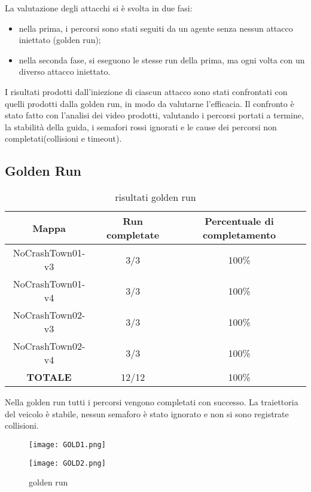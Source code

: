 La valutazione degli attacchi si è svolta in due fasi:\begin{itemize}
    \item nella prima, i percorsi sono stati seguiti da un agente senza nessun attacco iniettato (golden run);
    \item nella seconda fase, si eseguono le stesse run della prima, ma ogni volta con un diverso attacco iniettato.
\end{itemize}
I risultati prodotti dall'iniezione di ciascun attacco sono stati confrontati con quelli prodotti dalla golden run, in modo da valutarne l'efficacia.
Il confronto è stato fatto con l'analisi dei video prodotti, valutando i percorsi portati a termine,  la stabilità della guida, i semafori rossi ignorati e le cause dei percorsi
non completati(collisioni e timeout).
\subsection{Golden Run}
\begin{table}[h]
    \begin{tabular}{|c|c|c|}
        \hline
        Mappa                   & Run completate & Percentuale di completamento\\
        \hline
        NoCrashTown01-v3        & 3/3            & 100\% \\
        NoCrashTown01-v4        & 3/3            & 100\% \\
        NoCrashTown02-v3        & 3/3            & 100\% \\
        NoCrashTown02-v4        & 3/3            & 100\%  \\
        \hline
        \textbf{TOTALE}                  & 12/12          & 100\% \\
        \hline
    \end{tabular}
    \caption{risultati golden run}
Nella golden run tutti i percorsi vengono completati con successo. La traiettoria del veicolo è stabile, nessun semaforo è stato ignorato e non si sono registrate collisioni.
\end{table}
\begin{figure}[h!]
    \centering
    \parbox{6cm}{
    \texttt{[image: GOLD1.png]}
    \label{fig:gold1}}
    \qquad
    \begin{minipage}{6cm}
    \texttt{[image: GOLD2.png]}
    \label{fig:gold2}
    \end{minipage}
    \caption{golden run}
    \label{fig:goldrun}
    \end{figure}
\newpage
